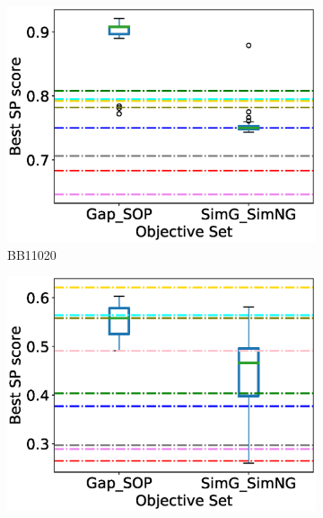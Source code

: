 \begin{figure}[!htbp]
\begin{adjustwidth}{-1cm}{-1cm}
\begin{subfigure}{0.26\textwidth}
			\includegraphics[width=\columnwidth]{Figure/summary/precomputedInit/Balibase/BB11020_objset_pairs_rank_2}
			\caption{BB11020}
		\end{subfigure}
		\begin{subfigure}{0.26\textwidth}
			\includegraphics[width=\columnwidth]{Figure/summary/precomputedInit/Balibase/BB11033_objset_pairs_rank_2}

\end{subfigure}
\end{adjustwidth}
\end{figure}
